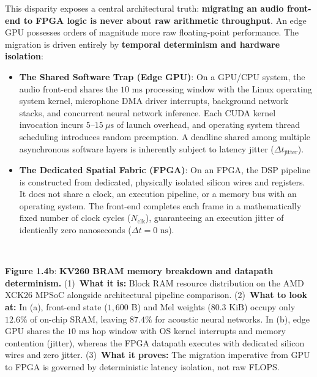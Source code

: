 \documentclass[11pt,a4paper]{article}
\begin{document}
This disparity exposes a central architectural truth: \textbf{migrating an audio front-end to FPGA logic is never about raw arithmetic throughput}. An edge GPU possesses orders of magnitude more raw floating-point performance. The migration is driven entirely by \textbf{temporal determinism and hardware isolation}:
\begin{itemize}\setlength{\itemsep}{0.5mm}\setlength{\parskip}{0pt}
  \item \textbf{The Shared Software Trap (Edge GPU)}: On a GPU/CPU system, the audio front-end shares the $10\text{ ms}$ processing window with the Linux operating system kernel, microphone DMA driver interrupts, background network stacks, and concurrent neural network inference. Each CUDA kernel invocation incurs $5\text{--}15\ \mu\text{s}$ of launch overhead, and operating system thread scheduling introduces random preemption. A deadline shared among multiple asynchronous software layers is inherently subject to latency jitter ($\Delta t_{\text{jitter}}$).
  \item \textbf{The Dedicated Spatial Fabric (FPGA)}: On an FPGA, the DSP pipeline is constructed from dedicated, physically isolated silicon wires and registers. It does not share a clock, an execution pipeline, or a memory bus with an operating system. The front-end completes each frame in a mathematically fixed number of clock cycles ($N_{\text{clk}}$), guaranteeing an execution jitter of identically zero nanoseconds ($\Delta t = 0\text{ ns}$).
\end{itemize}

\clearpage

\vspace*{-4.5mm}
\begin{center}
\begin{minipage}{\textwidth}
\centering
\resizebox{0.94\textwidth}{!}{}\\[1mm]
\begin{minipage}{0.96\textwidth}
\small\textbf{Figure 1.4b}: \textbf{KV260 BRAM memory breakdown and datapath determinism.} (1)~\textbf{What it is:} Block RAM resource distribution on the AMD XCK26 MPSoC alongside architectural pipeline comparison. (2)~\textbf{What to look at:} In (a), front-end state ($1{,}600\text{ B}$) and Mel weights ($80.3\text{ KiB}$) occupy only $12.6\%$ of on-chip SRAM, leaving $87.4\%$ for acoustic neural networks. In (b), edge GPU shares the $10\text{ ms}$ hop window with OS kernel interrupts and memory contention (jitter), whereas the FPGA datapath executes with dedicated silicon wires and zero jitter. (3)~\textbf{What it proves:} The migration imperative from GPU to FPGA is governed by deterministic latency isolation, not raw FLOPS.
\end{minipage}
\end{minipage}
\end{center}
\vspace{-2.5mm}
\end{document}
